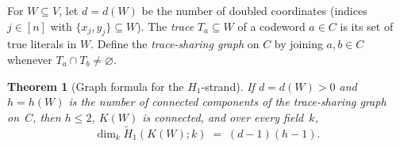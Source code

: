 \documentclass[11pt]{article}
\theoremstyle{plain}
\newtheorem{theorem}{Theorem}
\theoremstyle{definition}
\theoremstyle{remark}
\begin{document}
For $W \subseteq V$, let $d = d(W)$ be the number of doubled coordinates (indices $j \in [n]$ with $\{x_j,y_j\} \subseteq W$). The \emph{trace} $T_a \subseteq W$ of a codeword $a \in C$ is its set of true literals in $W$. Define the \emph{trace-sharing graph} on $C$ by joining $a, b \in C$ whenever $T_a \cap T_b \neq \varnothing$.

\begin{theorem}[Graph formula for the $H_1$-strand]\label{thm:h1}
If $d = d(W) > 0$ and $h = h(W)$ is the number of connected components of the trace-sharing graph on~$C$, then $h \le 2$, $K(W)$ is connected, and over every field~$k$,
\begin{equation}\label{eq:h1}
\dim_k \widetilde{H}_1(K(W); k) \;=\; (d-1)(h-1).
\end{equation}
\end{theorem}
\end{document}
